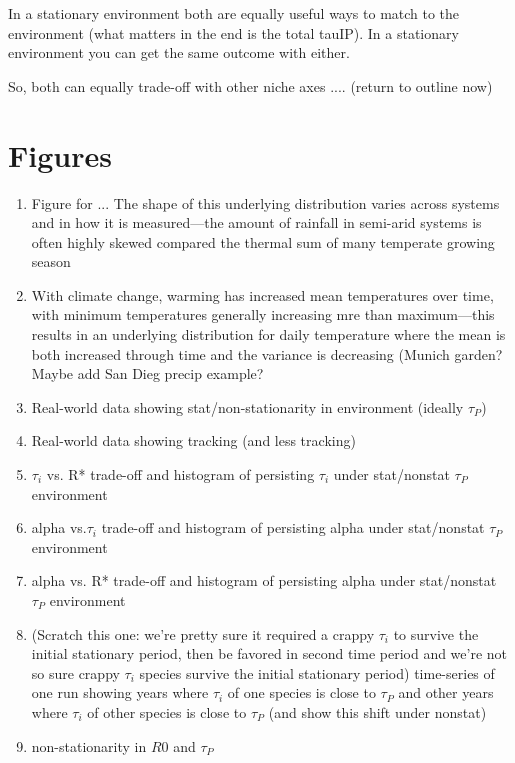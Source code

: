 \documentclass[11pt,letterpaper]{article}
\begin{document}
In a stationary environment both are equally useful ways to match to the environment (what matters in the end is the total tauIP). In a stationary environment you can get the same outcome with either. 

So, both can equally trade-off with other niche axes .... (return to outline now)




\newpage
\section{Figures}
\begin{enumerate}
\item Figure for ... The shape of this underlying distribution varies across systems and in how it is measured---the amount of rainfall in semi-arid systems is often highly skewed compared the thermal sum of many temperate growing season
\item With climate change, warming has increased mean temperatures over time, with minimum temperatures generally increasing mre than maximum---this results in an underlying distribution for daily temperature where the mean is both increased through time and the variance is decreasing (Munich garden? Maybe add San Dieg precip example?
\item Real-world data showing stat/non-stationarity in environment (ideally $\tau_{P}$) 
\item Real-world data showing tracking (and less tracking)
\item $\tau_{i}$ vs. R* trade-off and histogram of persisting $\tau_i$ under stat/nonstat $\tau_{P}$ environment
\item alpha vs.$\tau_i$ trade-off and histogram of persisting alpha under stat/nonstat $\tau_{P}$ environment
\item alpha vs. R* trade-off and histogram of persisting alpha under stat/nonstat $\tau_{P}$ environment
\item (Scratch this one: we're pretty sure it required a crappy $\tau_i$ to survive the initial stationary period, then be favored in second time period and we're not so sure crappy $\tau_i$ species survive the initial stationary period) time-series of one run showing years where $\tau_i$ of one species is close to $\tau_{P}$ and other years where $\tau_i$ of other species is close to $\tau_{P}$ (and show this shift under nonstat)
\item non-stationarity in $R0$ and $\tau_{P}$
\end{enumerate}
\end{document}
